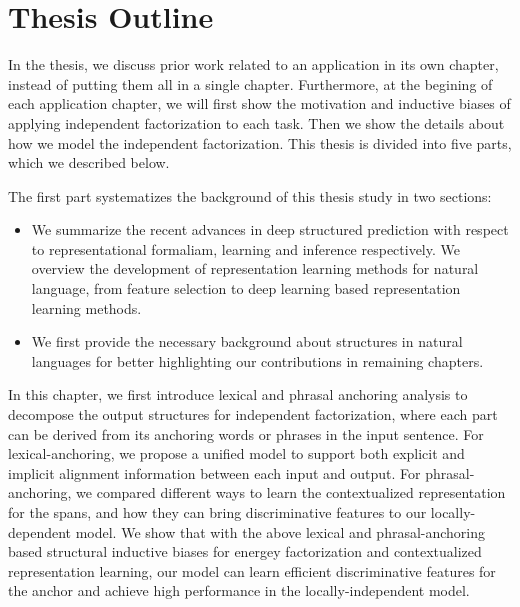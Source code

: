 
\section{Thesis Outline}
\label{sec:intro:roadmap}
In the thesis, we discuss prior work related to an application in its
own chapter, instead of putting them all in a single
chapter. Furthermore, at the begining of each application chapter, we
will first show the motivation and inductive biases of applying
independent factorization to each task. Then we show the details about
how we model the independent factorization. This thesis is divided
into five parts, which we described below.

 The first part systematizes the
background of this thesis study in two sections:
\begin{itemize}
\item {} We summarize
  the recent advances in deep structured prediction with respect to
  representational formaliam, learning and inference respectively. We
  overview the development of representation learning methods for
  natural language, from feature selection to deep learning based
  representation learning methods.

\item {} We first provide the necessary
  background about structures in natural languages for better
  highlighting our contributions in remaining chapters.
\end{itemize}

 In this chapter, we first introduce lexical and
phrasal anchoring analysis to decompose the output structures for
independent factorization, where each part can be derived from its
anchoring words or phrases in the input sentence. For
lexical-anchoring, we propose a unified model to support both explicit
and implicit alignment information between each input and output. For
phrasal-anchoring, we compared different ways to learn the
contextualized representation for the spans, and how they can bring
discriminative features to our locally-dependent model. We show that
with the above lexical and phrasal-anchoring based structural
inductive biases for energey factorization and contextualized
representation learning, our model can learn efficient discriminative
features for the anchor and achieve high performance in the
locally-independent model.

